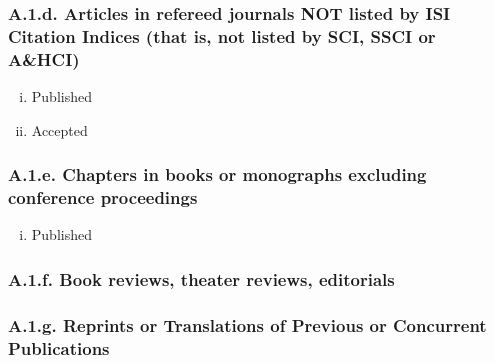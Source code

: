 \documentclass[12pt]{article}
\begin{document}
\subsubsection*{A.1.d. Articles in refereed journals NOT listed by ISI Citation Indices (that is, not listed by SCI, SSCI or A\&HCI)}
 
\begin{enumerate}[i)]
\item  Published %

\item  Accepted %
\end{enumerate}

\subsubsection*{A.1.e. Chapters in books or monographs excluding conference proceedings}

\begin{enumerate}[i)]
\item Published %
\end{enumerate}

\subsubsection*{A.1.f. Book reviews, theater reviews, editorials}


\subsubsection*{A.1.g. Reprints or Translations of Previous or Concurrent Publications}
\end{document}
